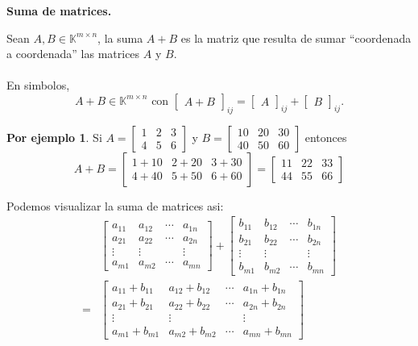 \documentclass{article}
\theoremstyle{definition}
\theoremstyle{definition}
\newtheorem*{ej}{Por ejemplo}
\theoremstyle{remark}
\begin{document}
\begin{center}
\textbf{Suma de matrices.}
\end{center}
\begin{defi}
  Sean $A,B \in \mathbb{K}^{m \times n}$, la suma $A+B$ es la matriz que resulta de sumar ``coordenada a coordenada'' las matrices $A$ y $B$.\\\\
  En simbolos, \[
    A+B\in\mathbb{K}^{m \times n} \text{ con } \begin{bmatrix}A+B\end{bmatrix}_{ij}=\begin{bmatrix}A\end{bmatrix}_{ij}+\begin{bmatrix}B\end{bmatrix}_{ij}.
  \]
\end{defi}
\begin{ej}
  Si $A=\begin{bmatrix}1 & 2 & 3 \\ 4 & 5 & 6 \end{bmatrix}$ y $B=\begin{bmatrix}10 & 20 & 30 \\ 40 & 50 & 60 \end{bmatrix}$ entonces \[
  A+B=\begin{bmatrix}1 + 10 & 2 + 20 & 3 + 30 \\ 4 + 40 & 5 + 50 & 6 + 60 \end{bmatrix} = \begin{bmatrix}11 & 22 & 33  \\ 44 & 55 & 66 \end{bmatrix}
\]
\end{ej}
Podemos visualizar la suma de matrices asi: \[
  \begin{aligned} 
    \phantom{=}&\begin{bmatrix} a_{11} & a_{12} & \cdots & a_{1n} \\
      a_{21} & a_{22} & \cdots & a_{2n}\\
      \vdots & \vdots & & \vdots \\
      a_{m1} & a_{m2} & \cdots & a_{mn}
\end{bmatrix} + \begin{bmatrix} b_{11} & b_{12} & \cdots & b_{1n} \\
   b_{21} & b_{22} & \cdots & b_{2n}\\
      \vdots & \vdots & & \vdots \\
      b_{m1} & b_{m2} & \cdots & b_{mn}
\end{bmatrix} \\
               = &\begin{bmatrix} a_{11}+b_{11} & a_{12}+b_{12} & \cdots & a_{1n}+b_{1n} \\
      a_{21}+b_{21} & a_{22}+b_{22} & \cdots & a_{2n}+b_{2n}\\
      \vdots & \vdots & & \vdots \\
      a_{m1}+b_{m1} & a_{m2}+b_{m2} & \cdots & a_{mn}+b_{mn}
\end{bmatrix} 
  \end{aligned}
\]
\end{document}
